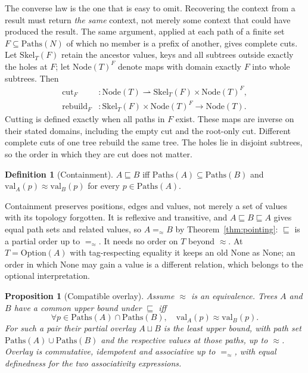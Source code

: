 \documentclass[11pt]{article}
\newtheorem{proposition}[theorem]{Proposition}
\theoremstyle{definition}
\newtheorem{definition}[theorem]{Definition}
\newcommand{\NodeT}[1]{\mathrm{Node}(#1)}
\newcommand{\eqS}{=_{\approx}}                     %
\newcommand{\Paths}{\mathrm{Paths}}
\begin{document}
The converse law is the one that is easy to omit. Recovering the context from a result must
return \emph{the same} context, not merely some context that could have produced the
result. The same argument, applied at each path of a finite set $F \subseteq \Paths(N)$ of
which no member is a prefix of another, gives complete cuts. Let $\mathrm{Skel}_T(F)$
retain the ancestor values, keys and all subtrees outside exactly the holes at $F$;
let $\NodeT{T}^{F}$ denote maps with domain exactly $F$ into whole subtrees. Then
\[
\begin{aligned}
\mathrm{cut}_F &: \NodeT{T} \rightharpoonup
  \mathrm{Skel}_T(F) \times \NodeT{T}^{F},\\
\mathrm{rebuild}_F &: \mathrm{Skel}_T(F) \times \NodeT{T}^{F}
  \longrightarrow \NodeT{T}.
\end{aligned}
\]
Cutting is defined exactly when all paths in $F$ exist. These maps are inverse on
their stated domains, including the empty cut and the root-only cut. Different
complete cuts of one tree rebuild the same tree. The holes lie in disjoint
subtrees, so the order in which they are cut does not matter.

\begin{definition}[Containment]\label{def:contain}
$A \sqsubseteq B$ iff $\Paths(A) \subseteq \Paths(B)$ and
$\mathrm{val}_A(p) \approx \mathrm{val}_B(p)$ for every $p \in \Paths(A)$.
\end{definition}

Containment preserves positions, edges and values, not merely a set of values with its
topology forgotten. It is reflexive and transitive, and $A \sqsubseteq B \sqsubseteq A$
gives equal path sets and related values, so $A \eqS B$ by
Theorem~\ref{thm:pointing}: $\sqsubseteq$ is a partial order up to $\eqS$. It needs no order
on $T$ beyond $\approx$. At $T = \mathrm{Option}(A)$ with tag-respecting equality it keeps an
old $\mathrm{None}$ as $\mathrm{None}$; an order in which $\mathrm{None}$ may gain a value is a
different relation, which belongs to the optional interpretation.

\begin{proposition}[Compatible overlay]\label{prop:overlay}
Assume $\approx$ is an equivalence. Trees $A$ and $B$ have a common upper bound
under $\sqsubseteq$ iff
\[
\forall p \in \Paths(A) \cap \Paths(B),\quad
\mathrm{val}_A(p) \approx \mathrm{val}_B(p).
\]
For such a pair their partial overlay $A \sqcup B$ is the least upper bound,
with path set $\Paths(A) \cup \Paths(B)$ and the respective values at those paths,
up to $\approx$. Overlay is commutative, idempotent and associative up to
$\eqS$, with equal definedness for the two associativity expressions.
\end{proposition}
\end{document}

